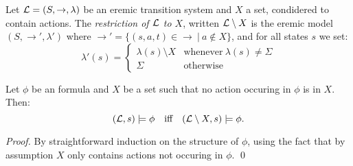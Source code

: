 


\begin{definition}
Let $\mathcal{L} = (S, \rightarrow, \lambda)$ be an eremic transition system
and $X$ a set, condidered to contain actions. The \emph{restriction of
  $\mathcal{L}$ to $X$}, written $\mathcal{L} \setminus X$ is the eremic model $(S,
\rightarrow', \lambda')$ where $\rightarrow' = \{(s, a, t) \in
\rightarrow \ |\ a \notin X\}$, and for all states $s$ we set:
\[
   \lambda'(s) 
        =
   \begin{cases}
       \lambda(s) \setminus  X & \text{whenever}\ \lambda(s) \neq \Sigma \\
       \Sigma & \text{otherwise}
   \end{cases}
\]

\end{definition}

\begin{lemma}\label{compactness:lemma:1717}
Let $\phi$ be an \ELABR{} formula and $X$ be a set such that no action
occuring in $\phi$ is in $X$. Then:
\[
   (\mathcal{L}, s) \models \phi
      \quad\text{iff}\quad
   (\mathcal{L} \setminus X, s) \models \phi.
\]
\end{lemma}
\begin{proof}
By straightforward induction on the structure of $\phi$, using the
fact that by assumption $X$ only contains actions not occuring in
$\phi$.  \qed
\end{proof}

